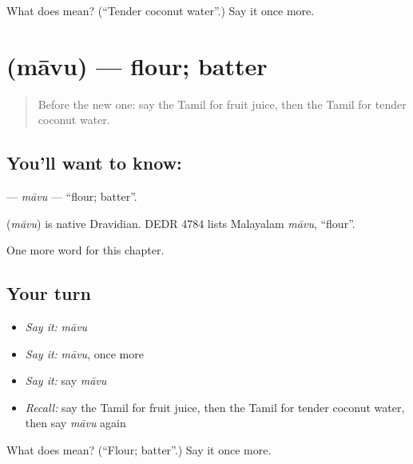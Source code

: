 \begin{tcolorbox}[breakable,colback=teal!4,colframe=teal!35!black,title={Before you move on}]
What does  mean? (\textquotedblleft{}Tender coconut water\textquotedblright{}.) Say it once more.
\end{tcolorbox}
\section[\texorpdfstring{\ta{மாவு} (māvu)}{மாவு (māvu)}]{ (māvu) — flour; batter}

\label{lesson:TA-C214-mavu}



\begin{quote}
Before the new one: say the Tamil for fruit juice, then the Tamil for tender coconut water.
\end{quote}

\subsection*{You'll want to know: }
\textbf{} — \emph{māvu} — \textquotedblleft{}flour; batter\textquotedblright{}.

\begin{cousinweb}
\textbf{} (\emph{māvu}) is native Dravidian. DEDR 4784 lists Malayalam \emph{māvu}, \textquotedblleft{}flour\textquotedblright{}.
\end{cousinweb}

\begin{grammarlens}[title={What you've built}]
One more word for this chapter.
\end{grammarlens}

\subsection*{Your turn}
\begin{itemize}
\raggedright
  \item \emph{Say it:} \emph{māvu}
  \item \emph{Say it:} \emph{māvu}, once more
  \item \emph{Say it:} say \emph{māvu}
  \item \emph{Recall:} say the Tamil for fruit juice, then the Tamil for tender coconut water, then say \emph{māvu} again
\end{itemize}

\begin{tcolorbox}[breakable,colback=teal!4,colframe=teal!35!black,title={Before you move on}]
What does  mean? (\textquotedblleft{}Flour; batter\textquotedblright{}.) Say it once more.
\end{tcolorbox}
